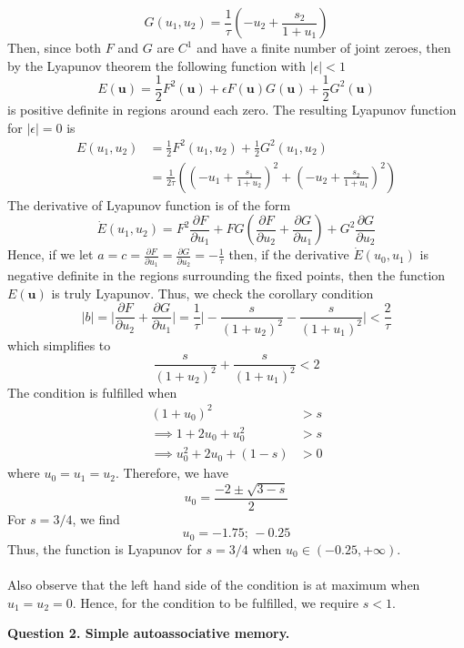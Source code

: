 \documentclass[12pt]{article}
\begin{document}
\begin{enumerate}
\[\] 
\[
    G(u_{1}, u_{2})=   \frac{1}{\tau}\left(-u_{2} + \frac{s_{2}}{1+u_{1}}\right)
\]
Then, since both $F$ and $G$ are $C^1$ and have a finite number of joint zeroes, then by the Lyapunov theorem the following function with $|\epsilon| < 1$
\[
    E(\mathbf{u}) = \frac{1}{2}F^2(\mathbf{u}) + \epsilon F(\mathbf{u})G(\mathbf{u}) + \frac{1}{2}G^2(\mathbf{u})
\]
is positive definite in regions around each zero. The resulting Lyapunov function for $|\epsilon| = 0$ is
\begin{align*}
    E(u_{1}, u_{2})&=\frac{1}{2}F^2(u_{1}, u_{2}) + \frac{1}{2}G^2(u_{1}, u_{2}) \\
    &= \frac{1}{2\tau}\left( \left(-u_{1} + \frac{s_{1}}{1+u_{2}}\right)^2 + \left(-u_{2} + \frac{s_{2}}{1+u_{1}}\right)^2 \right)
\end{align*}
The derivative of Lyapunov function is of the form
\[
    \dot E(u_{1}, u_{2}) = F^{2}\frac{\partial F}{\partial u_{1}} + FG\left(\frac{\partial F}{\partial u_{2}} + \frac{\partial G}{\partial u_{1}}\right) + G^{2}\frac{\partial G}{\partial u_{2}}
\]
Hence, if we let $a=c=\frac{\partial F}{\partial u_{1}}=\frac{\partial G}{\partial u_{2}}=-\frac{1}{\tau}$ then, if the derivative $\dot E(u_{0}, u_{1})$ is negative definite in 
the regions surrounding the fixed points, then the function $E(\mathbf{u})$ is truly Lyapunov. Thus, we check the corollary condition
\[
    |b|=\bigg|\frac{\partial F}{\partial u_{2}} + \frac{\partial G}{\partial u_{1}}\bigg| = \frac{1}{\tau}\bigg|-\frac{s}{(1+u_{2})^2} -\frac{s}{(1+u_{1})^2}\bigg|<\frac{2}{\tau}
\]
which simplifies to
\[
    \frac{s}{(1+u_{2})^2} +\frac{s}{(1+u_{1})^2}<2
\]
The condition is fulfilled when
\begin{align*}
    (1+u_{0})^2 &> s\\
    \implies 1 + 2u_{0} + u_{0}^{2} &> s\\
    \implies u_{0}^{2} + 2u_{0} + (1-s) &> 0
\end{align*}
where $u_{0}=u_{1}=u_{2}$. Therefore, we have
\[
    u_{0}=\frac{-2 \pm \sqrt{3-s}}{2}
\]
For $s=3/4$, we find
\[
      u_{0}=-1.75; \, -0.25 
\]
Thus, the function is Lyapunov for $s=3/4$ when $u_{0} \in (-0.25, +\infty)$.\\
\\
Also observe that the left hand side of the condition is at maximum when $u_{1}=u_{2}=0$. Hence, for the condition to be fulfilled, we require $s<1$.
\end{enumerate}
\newpage
\noindent\textbf{Question 2. Simple autoassociative memory.}
\end{document}
